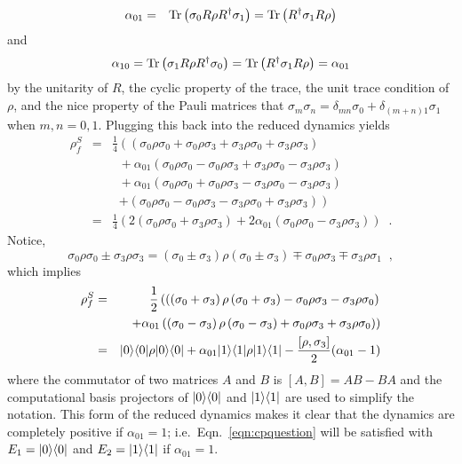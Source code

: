\begin{example}
\begin{eqnarray*}
\alpha_{01} &=& \operatorname{Tr}\left( \sigma_0 R \rho R^\dagger \sigma_1 \right) = \operatorname{Tr}\left( R^\dagger \sigma_1 R \rho \right)
\end{eqnarray*}
and
$$
\alpha_{10} = \operatorname{Tr}\left( \sigma_1 R \rho R^\dagger \sigma_0 \right) = \operatorname{Tr}\left( R^\dagger \sigma_1 R \rho \right) = \alpha_{01}
$$
by the unitarity of $R$, the cyclic property of the trace, the unit trace condition of $\rho$, and the nice property of the Pauli matrices that $\sigma_m\sigma_n = \delta_{mn} \sigma_0 + \delta_{(m+n)1}\sigma_1$ when $m,n=0,1$.  Plugging this back into the reduced dynamics yields
\begin{eqnarray*}
\rho^S_f &=& \frac{1}{4}\left( \left(\sigma_0\rho\sigma_0 + \sigma_0\rho\sigma_3 + \sigma_3\rho\sigma_0 + \sigma_3\rho\sigma_3\right)\right.\\
& &\;\;+ \alpha_{01} \left( \sigma_0\rho\sigma_0 - \sigma_0\rho\sigma_3 + \sigma_3\rho\sigma_0 - \sigma_3\rho\sigma_3\right)\\
& &\;\; + \alpha_{01}\left( \sigma_0\rho\sigma_0 +\sigma_0\rho\sigma_3 - \sigma_3\rho\sigma_0 - \sigma_3\rho\sigma_3 \right) \\
& &\;\;\left.+ \left( \sigma_0\rho\sigma_0 - \sigma_0\rho\sigma_3 - \sigma_3\rho\sigma_0 +\sigma_3\rho\sigma_3 \right) \right)\\
&=& \frac{1}{4}\left( 2 \left(\sigma_0\rho\sigma_0 + \sigma_3\rho\sigma_3\right)+ 2\alpha_{01} \left( \sigma_0\rho\sigma_0 - \sigma_3\rho\sigma_3\right)\right)\;\;.
\end{eqnarray*}
Notice,
$$
\sigma_0\rho\sigma_0 \pm \sigma_3\rho\sigma_3 = \left(\sigma_0\pm\sigma_3\right)\rho\left(\sigma_0\pm\sigma_3\right) \mp \sigma_0\rho\sigma_3 \mp \sigma_3\rho\sigma_1\;\;,
$$
which implies
\begin{eqnarray*}
\rho^S_f &=& \frac{1}{2}\left( \left(\left(\sigma_0+\sigma_3\right)\rho\left(\sigma_0+\sigma_3\right) - \sigma_0\rho\sigma_3 - \sigma_3\rho\sigma_0\right)\right.\\
& &\;\;\left. + \alpha_{01} \left( \left(\sigma_0-\sigma_3\right)\rho\left(\sigma_0-\sigma_3\right) + \sigma_0\rho\sigma_3 + \sigma_3\rho\sigma_0\right)\right)\\
&=& |0\rangle\langle0|\rho|0\rangle\langle0| + \alpha_{01} |1\rangle\langle1|\rho|1\rangle\langle1| - \frac{[\rho,\sigma_3]}{2}(\alpha_{01}-1)
\end{eqnarray*}
where the commutator of two matrices $A$ and $B$ is $[A,B] = AB-BA$ and the computational basis projectors of $|0\rangle\langle0|$ and $|1\rangle\langle1|$ are used to simplify the notation.  This form of the reduced dynamics makes it clear that the dynamics are completely positive if $\alpha_{01}=1$; i.e.\ Eqn.\ \ref{eqn:cpquestion} will be satisfied with $E_1 = |0\rangle\langle0|$ and $E_2 = |1\rangle\langle1|$ if $\alpha_{01}=1$.  


\end{example}
